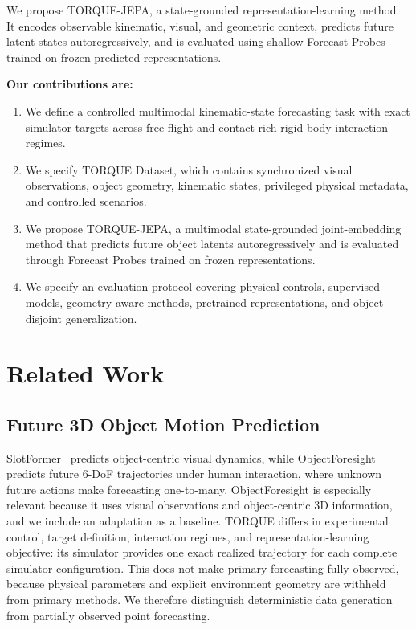 \documentclass{article}
\begin{document}
We propose TORQUE-JEPA, a state-grounded representation-learning method. It encodes observable kinematic, visual, and geometric context, predicts future latent states autoregressively, and is evaluated using shallow Forecast Probes trained on frozen predicted representations.

\textbf{Our contributions are:}
\begin{enumerate}
    \item We define a controlled multimodal kinematic-state forecasting task with exact simulator targets across free-flight and contact-rich rigid-body interaction regimes.
    \item We specify TORQUE Dataset, which contains synchronized visual observations, object geometry, kinematic states, privileged physical metadata, and controlled scenarios.
    \item We propose TORQUE-JEPA, a multimodal state-grounded joint-embedding method that predicts future object latents autoregressively and is evaluated through Forecast Probes trained on frozen representations.
    \item We specify an evaluation protocol covering physical controls, supervised models, geometry-aware methods, pretrained representations, and object-disjoint generalization.
\end{enumerate}

\section{Related Work}

\subsection{Future 3D Object Motion Prediction}

SlotFormer~\cite{wu_slotformer_2023} predicts object-centric visual dynamics, while ObjectForesight~\cite{soraki_objectforesight_2026} predicts future 6-DoF trajectories under human interaction, where unknown future actions make forecasting one-to-many. ObjectForesight is especially relevant because it uses visual observations and object-centric 3D information, and we include an adaptation as a baseline. TORQUE differs in experimental control, target definition, interaction regimes, and representation-learning objective: its simulator provides one exact realized trajectory for each complete simulator configuration. This does not make primary forecasting fully observed, because physical parameters and explicit environment geometry are withheld from primary methods. We therefore distinguish deterministic data generation from partially observed point forecasting.
\end{document}
